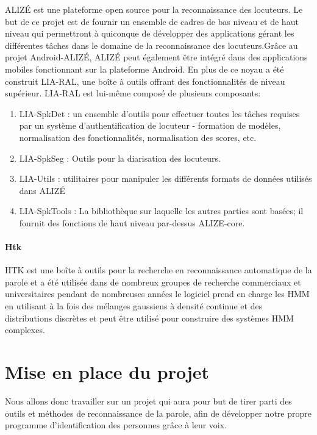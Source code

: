 \documentclass[a4paper, 12pt]{book}
\newcounter{program}[subsection]
\begin{document}
ALIZÉ est une plateforme open source pour la reconnaissance des locuteurs. Le but de ce projet est de fournir un ensemble de cadres de bas niveau et de haut niveau qui permettront à quiconque de développer des applications gérant les différentes tâches dans le domaine de la reconnaissance des locuteurs.Grâce au projet Android-ALIZÉ, ALIZÉ peut également être intégré dans des applications mobiles fonctionnant sur la plateforme Android. En plus de ce noyau a été construit LIA-RAL, une boîte à outils offrant des fonctionnalités de niveau supérieur. LIA-RAL est lui-même composé de plusieurs composants:

\begin{enumerate}

\item LIA-SpkDet : un ensemble d'outils pour effectuer toutes les tâches requises par un système d'authentification de locuteur - formation de modèles, normalisation des fonctionnalités, normalisation des scores, etc.
\item LIA-SpkSeg : Outils pour la diarisation des locuteurs.
\item LIA-Utils : utilitaires pour manipuler les différents formats de données utilisés dans ALIZÉ
\item LIA-SpkTools : La bibliothèque sur laquelle les autres parties sont basées; il fournit des fonctions de haut niveau par-dessus ALIZE-core.

\end{enumerate}

\subsubsection{Htk}
HTK est une boîte à outils pour la recherche en reconnaissance automatique de la parole et a été utilisée dans de nombreux groupes de recherche commerciaux et universitaires pendant de nombreuses années le logiciel prend en charge les HMM en utilisant à la fois des mélanges gaussiens à densité continue et des distributions discrètes et peut être utilisé pour construire des systèmes HMM complexes.

\chapter{Mise en place du projet}

Nous allons donc travailler sur un projet qui aura pour but de tirer parti des outils et méthodes de reconnaissance de la parole, afin de développer notre propre programme d'identification des personnes grâce à leur voix.
\end{document}

